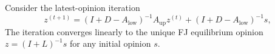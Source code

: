 \documentclass[sigconf,review, nonacm]{acmart}
\newcommand\s{\boldsymbol{\mathit{s}}}
\newcommand\zz{\boldsymbol{\mathit{z}}}
\renewcommand\AA{\boldsymbol{\mathit{A}}}
\newcommand\BB{\boldsymbol{\mathit{B}}}
\newcommand\DD{\boldsymbol{\mathit{D}}}
\newcommand\II{\boldsymbol{\mathit{I}}}
\newcommand\LL{\boldsymbol{\mathit{L}}}
\begin{document}
\begin{theorem}
	\label{thm:convergence}
	Consider the latest-opinion iteration
	\begin{equation}
		\zz^{(t+1)} = (\II+\DD-\AA_{\mathrm{low}})^{-1}\AA_{\mathrm{up}}\zz^{(t)} + (\II+\DD-\AA_{\mathrm{low}})^{-1}\s,
		\label{eq:con_latest_iter}
	\end{equation}
	The iteration converges linearly to the unique FJ equilibrium opinion
	$\zz = (\II+\LL)^{-1}\s$ for any initial opinion $\s$. 
\end{theorem} 


%	
%	
%	
\end{document}
